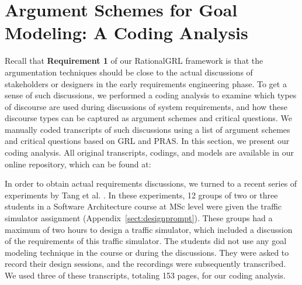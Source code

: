 \section{Argument Schemes for Goal Modeling: A Coding Analysis}
\label{sect:gmas}

Recall that \textbf{Requirement 1} of our RationalGRL framework is that the argumentation techniques should be close to the actual discussions of stakeholders or designers in the early requirements engineering phase. To get a sense of such discussions, we performed a coding analysis to examine which types of discourse are used during discussions of system requirements, and how these discourse types can be captured as argument schemes and critical questions. We manually coded transcripts of such discussions using a list of argument schemes and critical questions based on GRL and PRAS. In this section, we present our coding analysis. All original transcripts, codings, and models are available in our online repository, which can be found at:  
 
\begin{quote}
\rationalgrlurl{}
\end{quote}

In order to obtain actual requirements discussions, we turned to a recent series of experiments by Tang et al. \cite{TangEtal2018}. In these experiments, 12 groups of two or three students in a Software Architecture course at MSc level were given the traffic simulator assignment (Appendix~\ref{sect:designprompt}). These groups had a maximum of two hours to design a traffic simulator, which included a discussion of the requirements of this traffic simulator. The students did not use any goal modeling technique in the course or during the discussions. They were asked to record their design sessions, and the recordings were subsequently transcribed. We used three of these transcripts, totaling 153 pages, for our coding analysis. 


